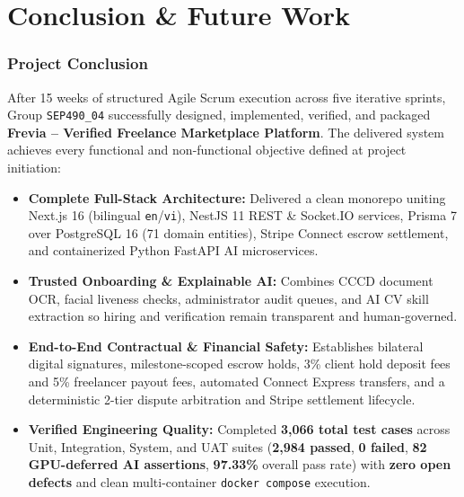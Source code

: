 \part{Conclusion \& Future Work}

\section{Project Conclusion}

After 15 weeks of structured Agile Scrum execution across five iterative sprints, Group \texttt{SEP490\_04} successfully designed, implemented, verified, and packaged \textbf{Frevia -- Verified Freelance Marketplace Platform}. The delivered system achieves every functional and non-functional objective defined at project initiation:

\begin{itemize}[leftmargin=1.0cm, itemsep=4pt]
    \item \textbf{Complete Full-Stack Architecture:} Delivered a clean monorepo uniting Next.js 16 (bilingual \texttt{en}/\texttt{vi}), NestJS 11 REST \& Socket.IO services, Prisma 7 over PostgreSQL 16 (71 domain entities), Stripe Connect escrow settlement, and containerized Python FastAPI AI microservices.
    \item \textbf{Trusted Onboarding \& Explainable AI:} Combines CCCD document OCR, facial liveness checks, administrator audit queues, and AI CV skill extraction so hiring and verification remain transparent and human-governed.
    \item \textbf{End-to-End Contractual \& Financial Safety:} Establishes bilateral digital signatures, milestone-scoped escrow holds, 3\% client hold deposit fees and 5\% freelancer payout fees, automated Connect Express transfers, and a deterministic 2-tier dispute arbitration and Stripe settlement lifecycle.
    \item \textbf{Verified Engineering Quality:} Completed \textbf{3,066 total test cases} across Unit, Integration, System, and UAT suites (\textbf{2,984 passed}, \textbf{0 failed}, \textbf{82 GPU-deferred AI assertions}, \textbf{97.33\%} overall pass rate) with \textbf{zero open defects} and clean multi-container \texttt{docker compose} execution.
\end{itemize}

